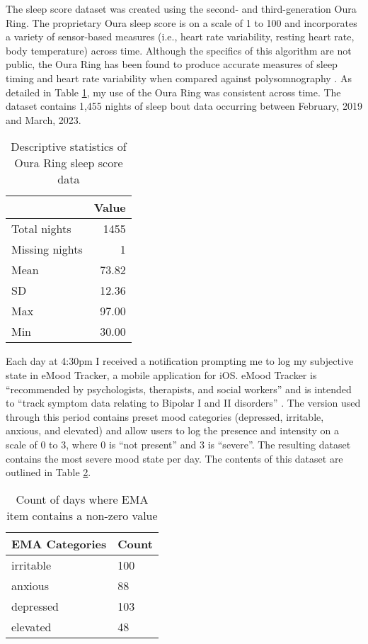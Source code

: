 \documentclass{article}
\begin{document}
The sleep score dataset was created using the second- and third-generation Oura
Ring. The proprietary Oura sleep score is on a scale of 1 to 100 and
incorporates a variety of sensor-based measures (i.e., heart rate variability,
resting heart rate, body temperature) across time. Although the specifics of this
algorithm are not public, the Oura Ring has been found to produce
accurate measures of sleep timing and heart rate variability when compared
against polysomnography \citep{dezambottiSleep2019}. As detailed in Table
\ref{Sleep}, my use of the Oura Ring was consistent across time. The dataset
contains 1,455 nights of sleep bout data occurring between February, 2019 and
March, 2023.

\begin{table}[hb]
  \centering
  \begin{tabular}{lr}
  \toprule
     & \textbf{Value}\\ \midrule
      Total nights & 1455 \\
      Missing nights & 1 \\
      Mean & 73.82 \\
      SD & 12.36 \\
      Max & 97.00 \\
      Min & 30.00 \\
   \bottomrule
  \end{tabular}
\caption{Descriptive statistics of Oura Ring sleep score data}
\label{Sleep}
\end{table}

Each day at 4:30pm I received a notification prompting me to log my subjective
state in eMood Tracker, a mobile application for iOS. eMood Tracker is
``recommended by psychologists, therapists, and social workers'' and is intended
to ``track symptom data relating to Bipolar I and II disorders''
\citep{eMoods2023}. The version used through this period contains preset mood
categories (depressed, irritable, anxious, and elevated) and allow users to log
the presence and intensity on a scale of 0 to 3, where 0 is ``not present'' and
3 is ``severe''. The resulting dataset contains the most severe mood state per
day. The contents of this dataset are outlined in Table \ref{EMA}.

\begin{table}
    \centering
    \begin{tabular}{ll}
    \toprule
        \textbf{EMA Categories} & \textbf{Count} \\ \midrule
        irritable & 100 \\
        anxious & 88  \\
        depressed & 103  \\
        elevated & 48  \\
        \bottomrule
    \end{tabular}
\caption{Count of days where EMA item contains a non-zero value}
\label{EMA}
\end{table}
\end{document}
